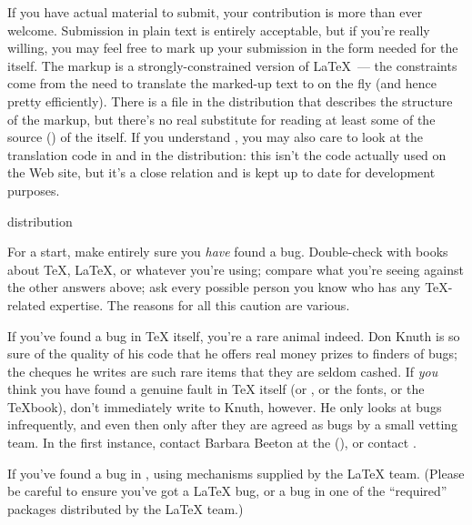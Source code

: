If you have actual material to submit, your contribution is more than
ever welcome.  Submission in plain text is entirely acceptable, but
if you're really willing, you may feel free to mark up your submission
in the form needed for the  itself.  The markup is a
strongly-constrained version of \LaTeX{}~--- the constraints come from
the need to translate the marked-up text to  on the fly
(and hence pretty efficiently).  There is a file 
in the  distribution that describes the structure of the
markup, but there's no real substitute for reading at least some of
the source () of the  itself.  If you
understand , you may also care to look at the
translation code in  and  in the
distribution: this isn't the code actually used on the Web site, but
it's a close relation and is kept
up to date for development purposes.
\begin{ctanrefs}
\item[\nothtml{\rmfamily}\acro{FAQ} distribution]
\end{ctanrefs}


For a start, make entirely sure you \emph{have} found a bug.
Double-check with books about \TeX{}, \LaTeX{}, or whatever you're using;
compare what you're seeing against the other answers above; ask every
possible person you know who has any \TeX{}-related expertise.
The reasons for all this caution are various.

If you've found a bug in \TeX{} itself, you're a rare animal indeed.
Don Knuth is so sure of the quality of his code that he offers real
money prizes to finders of bugs; the cheques he writes are
such rare items that they are seldom cashed. If \emph{you}
think you have found a genuine fault in \TeX{} itself (or \MF{}, or the
 fonts, or the \TeX{}book), don't immediately write to Knuth,
however. He only looks at bugs infrequently, and even then
only after they are agreed as bugs by a small vetting team. In the
first instance, contact Barbara Beeton at the 
(), or contact
.

If you've found a bug in \LaTeXe{}, 
using mechanisms supplied by the \LaTeX{} team.  (Please be
careful to ensure you've got a \LaTeX{} bug, or a bug in one of the
``required''  packages distributed by the \LaTeX{} team.)

